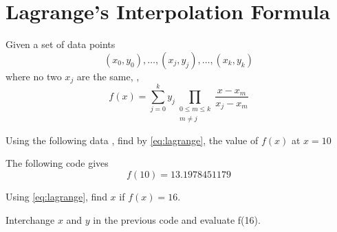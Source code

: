 \documentclass[journal,12pt,twocolumn]{IEEEtran}
\begin{document}
\section{Lagrange's Interpolation Formula}
\begin{theorem}
Given a set of data points
\begin{equation*}
(x_{0},y_{0}),\ldots ,(x_{j},y_{j}),\ldots ,(x_{k},y_{k})
\end{equation*}
where no two $x_j$ are the same, \cite{lagrange}, 
\begin{equation}
\label{eq:lagrange}
f(x)=\sum _{j=0}^{k}y_{j}\prod _{\begin{smallmatrix}0\leq m\leq k\\m\neq j\end{smallmatrix}}{\frac {x-x_{m}}{x_{j}-x_{m}}}
\end{equation}
\end{theorem}
\begin{problem}
Using the following data \cite{nptel_lagrange}, find by \eqref{eq:lagrange}, the value of $ f(x)$ at $ x = 10$
\end{problem}

\solution  The following code gives
\begin{equation}
f(10) = 13.1978451179
\end{equation}

\begin{problem}
Using  \eqref{eq:lagrange}, find $x$ if $f(x) = 16$. 
\end{problem}
\solution Interchange $x$ and $y$ in the previous code and evaluate f(16).
\end{document}
